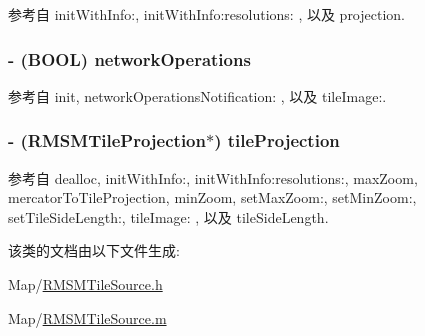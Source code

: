 参考自 init\-With\-Info\-:, init\-With\-Info\-:resolutions\-: , 以及 projection.

\hypertarget{interface_r_m_s_m_tile_source_adfde0811f0bd0c2f6ac822c67acc2e30}{
\subsubsection[{network\-Operations}]{\setlength{\rightskip}{0pt plus 5cm}-\/ (B\-O\-O\-L) network\-Operations\hspace{0.3cm}{\ttfamily [protected]}}}\label{interface_r_m_s_m_tile_source_adfde0811f0bd0c2f6ac822c67acc2e30}


参考自 init, network\-Operations\-Notification\-: , 以及 tile\-Image\-:.

\hypertarget{interface_r_m_s_m_tile_source_a317fdb087c2cbf6a59ce8e19048ce2c4}{
\subsubsection[{tile\-Projection}]{\setlength{\rightskip}{0pt plus 5cm}-\/ ({\bf R\-M\-S\-M\-Tile\-Projection}$\ast$) tile\-Projection\hspace{0.3cm}{\ttfamily [protected]}}}\label{interface_r_m_s_m_tile_source_a317fdb087c2cbf6a59ce8e19048ce2c4}


参考自 dealloc, init\-With\-Info\-:, init\-With\-Info\-:resolutions\-:, max\-Zoom, mercator\-To\-Tile\-Projection, min\-Zoom, set\-Max\-Zoom\-:, set\-Min\-Zoom\-:, set\-Tile\-Side\-Length\-:, tile\-Image\-: , 以及 tile\-Side\-Length.



该类的文档由以下文件生成\-:\begin{DoxyCompactItemize}
\item 
Map/\hyperlink{_r_m_s_m_tile_source_8h}{R\-M\-S\-M\-Tile\-Source.\-h}\item 
Map/\hyperlink{_r_m_s_m_tile_source_8m}{R\-M\-S\-M\-Tile\-Source.\-m}\end{DoxyCompactItemize}
